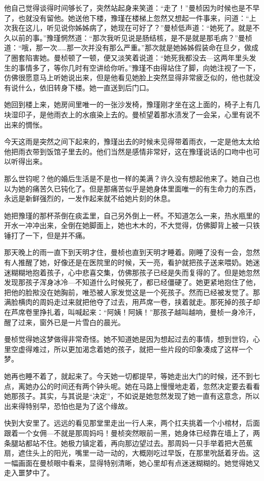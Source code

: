 \par 他自己觉得谈得时间够长了，突然站起身来笑道：“走了！”曼桢因为时候也是不早了，也就没有留他。她送他下楼，豫瑾在楼梯上忽然又想起一件事来，问道：“上次我在这儿，听见说你姊姊病了，她现在可好了？”曼桢低声道：“她死了。就是不久以前的事。”豫瑾惘然道：“那次我听见说是肠结核，是不是就是那毛病？”曼桢道：“哦，那一次……那一次并没有那么严重。”那次就是她姊姊假装命在旦夕，做成了圈套陷害她。曼桢顿了一顿，便又淡笑着说道：“她死我都没去—这两年里头发生的事情多了，等你几时有空讲给你听。”豫瑾不由得站住了脚，向她注视了一下，仿佛很愿意马上听她说出来，但是他看见她脸上突然显得非常疲乏似的，他也就没有说什么，依旧转身下楼。她一直送到后门口。
\par 她回到楼上来，她房间里唯一的一张沙发椅，豫瑾刚才坐在这上面的，椅子上有几块湿印子，是他雨衣上的水痕染上去的。曼桢望着那水渍发了一会呆，心里有说不出来的惆怅。
\par 今天这雨是突然之间下起来的，豫瑾出去的时候未见得带着雨衣，一定是他太太给他把雨衣带到饭馆子里去的。他们当然是感情非常好，这在豫瑾说话的口吻中也可以听得出来。
\par 那么世钧呢？他的婚后生活是不是也一样的美满？许久没有想起他来了。她自己也以为她的痛苦久已钝化了。但是那痛苦似乎是她身体里面唯一的有生命力的东西，永远是新鲜强烈的，一发作起来就不给她片刻的休息。
\par 她把豫瑾的那杯茶倒在痰盂里，自己另外倒上一杯。不知道怎么一来，热水瓶里的开水一冲冲出来，全倒在她脚面上，她也木木的，不大觉得，仿佛脚背上被一只铁锤打了一下，但是并不痛。
\par 那天晚上的雨一直下到天明才住，曼桢也直到天明才睡着。刚睡了没有一会，忽然有人推醒了她，好像还是在医院里的时候，天一亮，看护就把孩子送来喂奶。她迷迷糊糊地抱着孩子，心中悲喜交集，仿佛那孩子已经是失而复得的了。但是她忽然发现那孩子浑身冰冷—不知道什么时候死了，都已经僵硬了。她更紧地抱住了他，把他的脸揿没在她胸前，唯恐被人家发觉这是一个死孩子。然而已经被发觉了。那满脸横肉的周妈走过来就把他夺了过去，用芦席一卷，挟着就走。那死掉的孩子却在芦席卷里挣扎着，叫喊起来：“阿姨！阿姨！”那孩子越叫越响，曼桢一身冷汗，醒了过来，窗外已是一片雪白的晨光。
\par 曼桢觉得她这梦做得非常奇怪。她不知道她是因为想起过去的事情，想到世钧，心里空虚得难过，所以更加渴念着她的孩子，就把一些片段的印象凑成了这样一个梦。
\par 她再也睡不着了，就起来了。今天她一切都提早，等她走出大门的时候，还不到七点，离她办公的时间还有两个钟头呢。她在马路上慢慢地走着，忽然决定要去看看她那孩子。其实，与其说是“决定”，不如说是她忽然发现了她一直有这意念，所以出来得特别早，恐怕也是为了这个缘故。
\par 快到大安里了。远远的看见那堂里走出一行人来，两个扛夫挑着一个小棺材，后面跟着一个女佣—不就是那周妈吗！曼桢突然眼前一黑，她身体已经靠在墙上了，两条腿站都站不住。她极力镇定着，再向那边望过去。那周妈一只手举着把大芭蕉扇，遮住头上的阳光，嘴里一动一动的，大概刚吃过早饭，在那里吮舐着牙齿。这一幅画面在曼桢眼中看来，显得特别清晰，她心里却有点迷迷糊糊的。她觉得她又走入噩梦中了。
